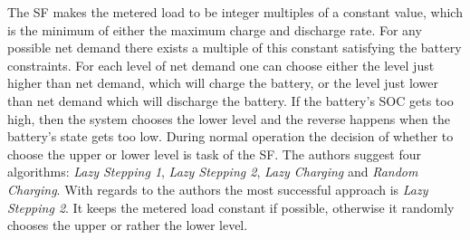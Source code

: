 \documentclass{article}
\begin{document}
The \ac{SF} \cite{Yang2012} makes the metered load to be integer multiples of a constant value, which is the minimum of either the maximum charge and discharge rate. For any possible net demand there exists a multiple of this constant satisfying the battery constraints. For each level of net demand one can choose either the level just higher than net demand, which will charge the battery, or the level just lower than net demand which will discharge the battery. If the battery's \ac{SOC} gets too high, then the system chooses the lower level and the reverse happens when the battery's state gets too low. During normal operation the decision of whether to choose the upper or lower level is task of the \ac{SF}. The authors suggest four algorithms: \textit{Lazy Stepping 1}, \textit{Lazy Stepping 2}, \textit{Lazy Charging} and \textit{Random Charging}. With regards to the authors the most successful approach is \textit{Lazy Stepping 2}. It keeps the metered load constant if possible, otherwise it randomly chooses the upper or rather the lower level.
\end{document}
